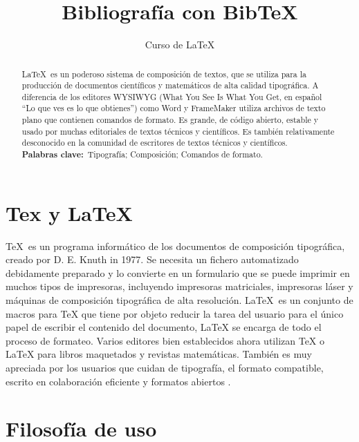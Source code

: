 \documentclass[12pt,letterpaper]{article}
\author{Curso de \LaTeX}
\title{Bibliografía con BibTeX}
\begin{document}
\maketitle %

\begin{abstract}
	\LaTeX\ es un poderoso sistema de composición de textos, que se utiliza
	para la producción de documentos científicos y matemáticos
	de alta calidad tipográfica. A diferencia de los editores WYSIWYG (What You See Is What You Get, en español ``Lo que ves es lo que obtienes'') como Word y FrameMaker 
	utiliza archivos de texto plano que contienen 
	comandos de formato. Es grande, de código abierto, estable y usado
	por muchas editoriales de textos técnicos y científicos. Es
	también relativamente desconocido en la comunidad de escritores de textos técnicos y científicos.\\
	
	\noindent\textbf{Palabras clave:}\ Tipografía; Composición; Comandos de formato.
\end{abstract}

\section{Tex y LaTeX} %

\TeX\ es un programa informático de los documentos de composición tipográfica, creado por D. E. Knuth in 1977\cite{HK}. Se necesita un fichero automatizado debidamente preparado y lo convierte en un formulario que se puede imprimir en muchos tipos de impresoras, incluyendo impresoras matriciales, impresoras láser y máquinas de composición tipográfica de alta resolución. \LaTeX\ es un conjunto de macros para TeX que tiene por objeto reducir la tarea del usuario para el único papel de escribir el contenido del documento, LaTeX se encarga de todo el proceso de formateo. Varios editores bien establecidos ahora utilizan TeX o LaTeX para libros maquetados y revistas matemáticas. También es muy apreciada por los usuarios que cuidan de tipografía, el formato compatible, escrito en colaboración eficiente y formatos abiertos \cite{Boney96}.

\section{Filosofía de uso} %
\end{document}
